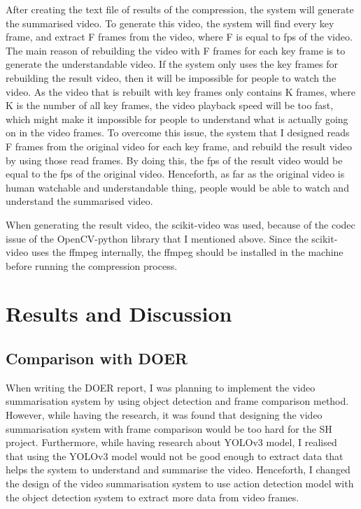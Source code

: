 \documentclass{article}
\begin{document}
After creating the text file of results of the compression, the system will generate the summarised video. To generate this video, the system will find every key frame, and extract F frames from the video, where F is equal to fps of the video. The main reason of rebuilding the video with F frames for each key frame is to generate the understandable video. If the system only uses the key frames for rebuilding the result video, then it will be impossible for people to watch the video. As the video that is rebuilt with key frames only contains K frames, where K is the number of all key frames, the video playback speed will be too fast, which might make it impossible for people to understand what is actually going on in the video frames. To overcome this issue, the system that I designed reads F frames from the original video for each key frame, and rebuild the result video by using those read frames. By doing this, the fps of the result video would be equal to the fps of the original video. Henceforth, as far as the original video is human watchable and understandable thing, people would be able to watch and understand the summarised video.

When generating the result video, the scikit-video was used, because of the codec issue of the OpenCV-python library that I mentioned above. Since the scikit-video uses the ffmpeg internally, the ffmpeg should be installed in the machine before running the compression process.


\section{Results and Discussion}

\subsection{Comparison with DOER}

When writing the DOER report, I was planning to implement the video summarisation system by using object detection and frame comparison method. However, while having the research, it was found that designing the video summarisation system with frame comparison would be too hard for the SH project. Furthermore, while having research about YOLOv3 model, I realised that using the YOLOv3 model would not be good enough to extract data that helps the system to understand and summarise the video. Henceforth, I changed the design of the video summarisation system to use action detection model with the object detection system to extract more data from video frames.
\end{document}

